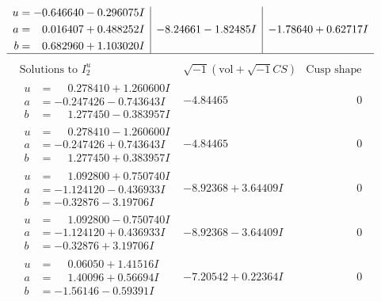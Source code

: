 \documentclass[1p]{elsarticle_modified}
\theoremstyle{definition}
\newcommand{\I}{\sqrt{-1}}
\begin{document}
$$\begin{array}{c|c|c}
\begin{aligned}
u &= -0.646640 - 0.296075 I \\
a &= \phantom{-}0.016407 + 0.488252 I \\
b &= \phantom{-}0.682960 + 1.103020 I\end{aligned}
 & -8.24661 - 1.82485 I & -1.78640 + 0.62717 I\\
 \hline 
 \end{array}$$\newpage$$\begin{array}{c|c|c}  
\text{Solutions to }I^u_{2}& \I (\text{vol} + \sqrt{-1}CS) & \text{Cusp shape}\\
 \hline 
\begin{aligned}
u &= \phantom{-}0.278410 + 1.260600 I \\
a &= -0.247426 - 0.743643 I \\
b &= \phantom{-}1.277450 - 0.383957 I\end{aligned}
 & -4.84465\phantom{ +0.000000I} & \phantom{-0.000000 } 0 \\ \hline\begin{aligned}
u &= \phantom{-}0.278410 - 1.260600 I \\
a &= -0.247426 + 0.743643 I \\
b &= \phantom{-}1.277450 + 0.383957 I\end{aligned}
 & -4.84465\phantom{ +0.000000I} & \phantom{-0.000000 } 0 \\ \hline\begin{aligned}
u &= \phantom{-}1.092800 + 0.750740 I \\
a &= -1.124120 - 0.436933 I \\
b &= -0.32876 - 3.19706 I\end{aligned}
 & -8.92368 + 3.64409 I & \phantom{-0.000000 } 0 \\ \hline\begin{aligned}
u &= \phantom{-}1.092800 - 0.750740 I \\
a &= -1.124120 + 0.436933 I \\
b &= -0.32876 + 3.19706 I\end{aligned}
 & -8.92368 - 3.64409 I & \phantom{-0.000000 } 0 \\ \hline\begin{aligned}
u &= \phantom{-}0.06050 + 1.41516 I \\
a &= \phantom{-}1.40096 + 0.56694 I \\
b &= -1.56146 - 0.59391 I\end{aligned}
 & -7.20542 + 0.22364 I & \phantom{-0.000000 } 0 \\ \hline\begin{aligned}

\end{aligned}
\end{array}$$
\end{document}
